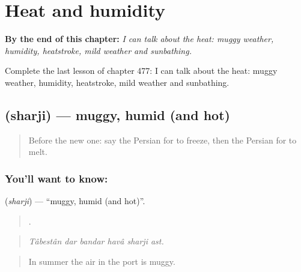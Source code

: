 
\chapter{Heat and humidity}
\label{ch:fa-heat-and-humidity}

\begin{chapteropening}
\textbf{By the end of this chapter:} \emph{I can talk about the heat: muggy weather, humidity, heatstroke, mild weather and sunbathing.}

Complete the last lesson of chapter 477: I can talk about the heat: muggy weather, humidity, heatstroke, mild weather and sunbathing.
\end{chapteropening}

\section[\texorpdfstring{\fa{شرجی} (sharji)}{شرجی (sharji)}]{ (sharji) — muggy, humid (and hot)}

\label{lesson:FA-C477-sharji}



\begin{quote}
Before the new one: say the Persian for to freeze, then the Persian for to melt.
\end{quote}

\subsection*{You'll want to know: }
\textbf{} (\emph{sharji}) — \textquotedblleft{}muggy, humid (and hot)\textquotedblright{}.

\begin{quote}
     .
\end{quote}

\begin{quote}
\emph{Tâbestân dar bandar havâ sharji ast.}
\end{quote}

\begin{quote}
In summer the air in the port is muggy.
\end{quote}

